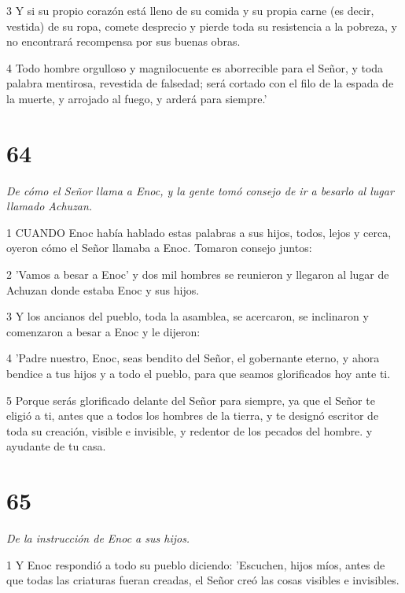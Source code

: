 \par 3 Y si su propio corazón está lleno de su comida y su propia carne (es decir, vestida) de su ropa, comete desprecio y pierde toda su resistencia a la pobreza, y no encontrará recompensa por sus buenas obras.

\par 4 Todo hombre orgulloso y magnilocuente es aborrecible para el Señor, y toda palabra mentirosa, revestida de falsedad; será cortado con el filo de la espada de la muerte, y arrojado al fuego, y arderá para siempre.'

\chapter{64}

\par \textit{De cómo el Señor llama a Enoc, y la gente tomó consejo de ir a besarlo al lugar llamado Achuzan.}

\par 1 CUANDO Enoc había hablado estas palabras a sus hijos, todos, lejos y cerca, oyeron cómo el Señor llamaba a Enoc. Tomaron consejo juntos:

\par 2 'Vamos a besar a Enoc' y dos mil hombres se reunieron y llegaron al lugar de Achuzan donde estaba Enoc y sus hijos.

\par 3 Y los ancianos del pueblo, toda la asamblea, se acercaron, se inclinaron y comenzaron a besar a Enoc y le dijeron:

\par 4 'Padre nuestro, Enoc, seas bendito del Señor, el gobernante eterno, y ahora bendice a tus hijos y a todo el pueblo, para que seamos glorificados hoy ante ti.

\par 5 Porque serás glorificado delante del Señor para siempre, ya que el Señor te eligió a ti, antes que a todos los hombres de la tierra, y te designó escritor de toda su creación, visible e invisible, y redentor de los pecados del hombre. y ayudante de tu casa.

\chapter{65}

\par \textit{De la instrucción de Enoc a sus hijos.}

\par 1 Y Enoc respondió a todo su pueblo diciendo: 'Escuchen, hijos míos, antes de que todas las criaturas fueran creadas, el Señor creó las cosas visibles e invisibles.

